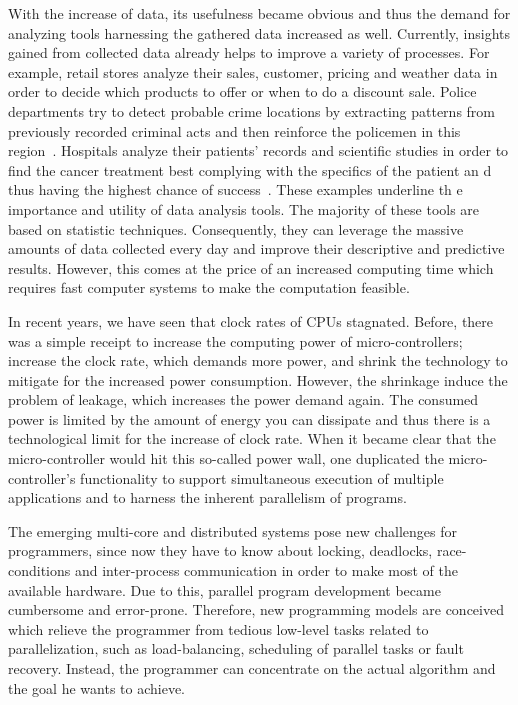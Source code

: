 \documentclass{dima}
\begin{document}
With the increase of data, its usefulness became obvious and thus the demand for analyzing tools harnessing the gathered data increased as well.
Currently, insights gained from collected data already helps to improve a variety of processes.
For example, retail stores analyze their sales, customer, pricing and weather data in order to decide which products to offer or  when to do a discount sale. 
Police departments try to detect probable crime locations by extracting patterns from previously recorded criminal acts and then  reinforce the policemen in  this region~\cite{lohr:yt2012a}. 
Hospitals analyze their patients' records and scientific studies in order to find the cancer treatment best complying with the  specifics of the patient an d thus having the highest chance  of success~\cite{mskcc:2013a}. 
These examples underline th e importance and utility of data  analysis tools. 
The majority of these tools are based on statistic techniques. 
Consequently, they can leverage the massive amounts of data collected every day and improve their descriptive and predictive results.
However, this comes at the price of an increased computing time which requires fast computer systems to make the computation feasible.

In recent years, we have seen that clock rates of CPUs stagnated.
Before, there was a simple receipt to increase the computing power of micro-controllers; increase the clock rate, which demands more power, and shrink the technology to mitigate for the increased power consumption.
However, the shrinkage induce the problem of leakage, which increases the power demand again.
The consumed power is limited by the amount of energy you can dissipate and thus there is a technological limit for the increase of clock rate.
When it became clear that the micro-controller would hit this so-called power wall, one duplicated the micro-controller's functionality to support simultaneous execution of multiple applications and to harness the inherent parallelism of programs.

The emerging multi-core and distributed systems pose new challenges for programmers, since now they have to know about locking, deadlocks, race-conditions and inter-process communication in order to make most of the available hardware.
Due to this, parallel program development became cumbersome and error-prone.
Therefore, new programming models are conceived which relieve the programmer from tedious low-level tasks related to parallelization, such as load-balancing, scheduling of parallel tasks or fault recovery.
Instead, the programmer can concentrate on the actual algorithm and the goal he wants to achieve.
\end{document}
